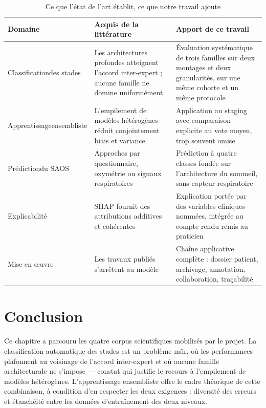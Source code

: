 \begin{table}[H]
\centering
\caption{Ce que l'état de l'art établit, ce que notre travail ajoute}
\label{tab:positionnement}
\small
\begin{tabular}{@{}L{3.2cm}L{5.3cm}L{5.3cm}@{}}
\toprule
\textbf{Domaine} & \textbf{Acquis de la littérature} & \textbf{Apport de ce travail} \\
\midrule
Classification\newline des stades &
Les architectures profondes atteignent l'accord inter-expert ; aucune famille ne
domine uniformément &
Évaluation systématique de trois familles sur deux montages et deux granularités,
sur une même cohorte et un même protocole \\
\addlinespace[3pt]
Apprentissage\newline ensembliste &
L'empilement de modèles hétérogènes réduit conjointement biais et variance &
Application au staging avec comparaison explicite au vote moyen, trop souvent omise \\
\addlinespace[3pt]
Prédiction\newline du SAOS &
Approches par questionnaire, oxymétrie ou signaux respiratoires &
Prédiction à quatre classes fondée sur l'architecture du sommeil, sans capteur
respiratoire \\
\addlinespace[3pt]
Explicabilité &
SHAP fournit des attributions additives et cohérentes &
Explication portée par des variables cliniques nommées, intégrée au compte rendu remis
au praticien \\
\addlinespace[3pt]
Mise en {\oe}uvre &
Les travaux publiés s'arrêtent au modèle &
Chaîne applicative complète : dossier patient, archivage, annotation, collaboration,
traçabilité \\
\bottomrule
\end{tabular}
\end{table}

\section{Conclusion}

Ce chapitre a parcouru les quatre corpus scientifiques mobilisés par le projet. La
classification automatique des stades est un problème mûr, où les performances
plafonnent au voisinage de l'accord inter-expert et où aucune famille architecturale
ne s'impose — constat qui justifie le recours à l'empilement de modèles hétérogènes.
L'apprentissage ensembliste offre le cadre théorique de cette combinaison, à condition
d'en respecter les deux exigences : diversité des erreurs et étanchéité entre les
données d'entraînement des deux niveaux.

